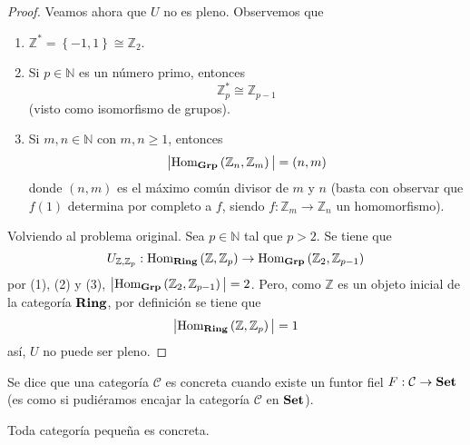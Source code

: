 \documentclass[12pt]{report}
\newcounter{it}
\theoremstyle{largebreak}
\newcommand\abs[1]{\ensuremath{\big|#1\big|}}
\newcommand\cf[3]{\ensuremath{#1:#2\rightarrow#3}}
\newcommand{\Hom}[3]{\ensuremath{\textup{Hom}_{#1}\left(#2,#3\right)}}
\newcommand{\Cat}[1]{\ensuremath{\textup{\textbf{#1}}}}
\begin{document}
\begin{proof}
        Veamos ahora que $U$ no es pleno. Observemos que
        \begin{enumerate}
            \item $\mathbb{Z}^*=\left\{-1,1 \right\}\cong\mathbb{Z}_2$.
            \item Si $p\in\mathbb{N}$ es un número primo, entonces
            \begin{equation*}
                \mathbb{Z}_p^*\cong\mathbb{Z}_{ p-1}
            \end{equation*}
            (visto como isomorfismo de grupos).
            \item Si $m,n\in\mathbb{N}$ con $m,n\geq 1$, entonces
            \begin{equation*}
                \abs{\Hom{\Cat{Grp}}{\mathbb{Z}_n}{\mathbb{Z}_m}}=(n,m)
            \end{equation*}
            donde $(n,m)$ es el máximo común divisor de $m$ y $n$ (basta con observar que $f(1)$ determina por completo a $f$, siendo $\cf{f}{\mathbb{Z}_m}{\mathbb{Z}_n}$ un homomorfismo).
        \end{enumerate}
        Volviendo al problema original. Sea $p\in\mathbb{N}$ tal que $p>2$. Se tiene que
        \begin{equation*}
            U_{ \mathbb{Z},\mathbb{Z}_p}:\Hom{\Cat{Ring}}{\mathbb{Z}}{\mathbb{Z}_p}\rightarrow\Hom{\Cat{Grp}}{\mathbb{Z}_2}{\mathbb{Z}_{ p-1}}
        \end{equation*}
        por (1), (2) y (3), $\abs{\Hom{\Cat{Grp}}{\mathbb{Z}_2}{\mathbb{Z}_{ p-1}}}=2$. Pero, como $\mathbb{Z}$ es un objeto inicial de la categoría $\Cat{Ring}$, por definición se tiene que
        \begin{equation*}
            \abs{\Hom{\Cat{Ring}}{\mathbb{Z}}{\mathbb{Z}_p}}=1
        \end{equation*}
        así, $U$ no puede ser pleno.
    \end{proof}

    \begin{mydef}
        Se dice que una categoría $\mathcal{C}$ es concreta cuando existe un funtor fiel $\cf{F}{\mathcal{C}}{\Cat{Set}}$ (es como si pudiéramos encajar la categoría $\mathcal{C}$ en $\Cat{Set}$).
    \end{mydef}

    \begin{propo}
        Toda categoría pequeña es concreta.
    \end{propo}
\end{document}
